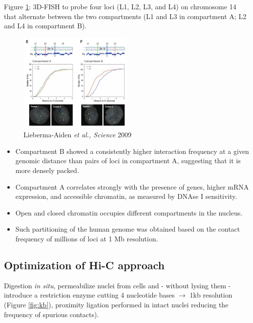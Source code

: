 Figure \ref{fig:fish}: 3D-FISH to probe four loci (L1, L2, L3, and L4) on chromosome 14 that alternate between the two compartments (L1 and L3 in compartment A; L2 and L4 in compartment B).

\begin{figure}
\centering
\includegraphics[width=0.5\textwidth]{../_resources/Screenshot_2022-10-19_at_09-06-00.png}
\caption{Lieberma-Aiden \emph{et al., Science} 2009}
\label{fig:fish}
\end{figure}

\begin{itemize}
\tightlist
\item
  Compartment B showed a consistently higher interaction frequency at a given genomic distance than pairs of loci in compartment A, suggesting that it is more densely packed.
\item
  Compartment A correlates strongly with the presence of genes, higher mRNA expression, and accessible chromatin, as measured by DNAse I sensitivity.
\item
  Open and closed chromatin occupies different compartments in the nucleus.
\item
  Such partitioning of the human genome was obtained based on the contact frequency of millions of loci at 1 Mb resolution.
\end{itemize}

\hypertarget{optimization-of-hi-c-approach}{%
\subsection{Optimization of Hi-C approach}\label{optimization-of-hi-c-approach}}

Digestion \emph{in situ}, permeabilize nuclei from cells and - without lysing them -  introduce a restriction enzyme cutting 4 nucleotide bases $\rightarrow$ 1kb resolution (Figure \ref{fig:kb}), proximity ligation performed in intact nuclei reducing the frequency of spurious contacts).

